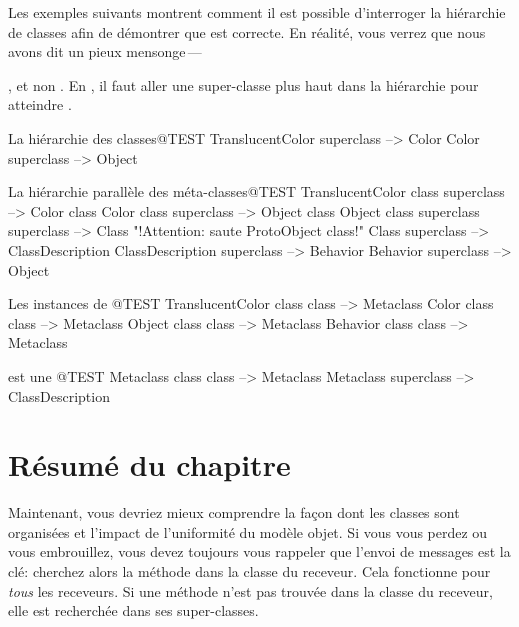 \documentclass[a4paper,10pt,twoside]{book}
\begin{document}
Les exemples suivants montrent comment il est possible d'interroger la hiérarchie de classes afin de démontrer que  est correcte.
En réalité, vous verrez que nous avons dit un pieux mensonge\,---\, {, et non . En \pharo, il faut aller une super-classe plus haut dans la hiérarchie pour atteindre .

\begin{example}{La hiérarchie des classes}{@TEST}
TranslucentColor superclass			--> Color
Color superclass			        --> Object
\end{example}

\begin{example}{La hi{é}rarchie parall{è}le des méta-classes}{@TEST}
TranslucentColor class superclass          --> Color class
Color class superclass                     --> Object class
Object class superclass superclass         --> Class    "!Attention: saute ProtoObject class!"
Class superclass                           --> ClassDescription
ClassDescription superclass                --> Behavior
Behavior superclass                        --> Object
\end{example}

\begin{example}{Les instances de }{@TEST}
TranslucentColor class class        --> Metaclass
Color class class                   --> Metaclass
Object class class                  --> Metaclass
Behavior class class                --> Metaclass
\end{example}

\begin{example}{ est une }{@TEST}
Metaclass class class --> Metaclass
Metaclass superclass --> ClassDescription
\end{example}

\section{Résumé du chapitre}

Maintenant, vous devriez mieux comprendre la façon dont les classes sont organisées et l'impact de l'uniformité du modèle objet.
Si vous vous perdez ou vous embrouillez, vous devez toujours vous rappeler que l'envoi de messages est la clé: cherchez alors la méthode dans la classe du receveur.
Cela fonctionne pour \emph{tous} les receveurs.
Si une méthode n'est pas trouvée dans la classe du receveur, elle est recherchée dans ses super-classes.


}
\end{document}

